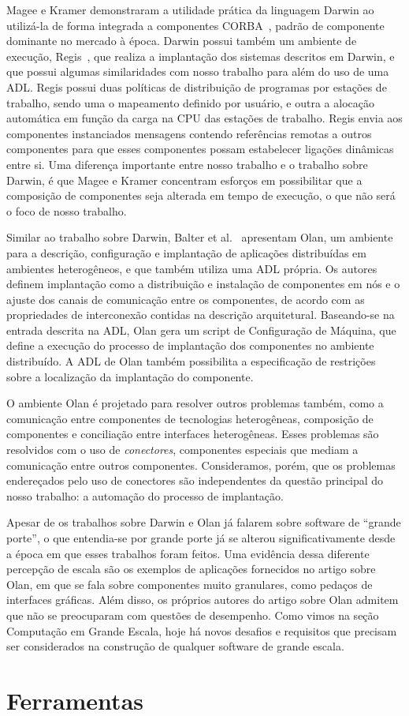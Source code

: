 Magee e Kramer demonstraram a utilidade prática da linguagem Darwin ao utilizá-la de forma integrada a componentes CORBA~\cite{Magee1997Corba}, padrão de componente dominante no mercado à época. Darwin possui também um ambiente de execução, Regis~\cite{Magee1994Regis}, que realiza a implantação dos sistemas descritos em Darwin, e que possui algumas similaridades com nosso trabalho para além do uso de uma ADL. Regis possui duas políticas de distribuição de programas por estações de trabalho, sendo uma o mapeamento definido por usuário, e outra a alocação automática em função da carga na CPU das estações de trabalho. Regis envia aos componentes instanciados mensagens contendo referências remotas a outros componentes para que esses componentes possam estabelecer ligações dinâmicas entre si. Uma diferença importante entre nosso trabalho e o trabalho sobre Darwin, é que Magee e Kramer concentram esforços em possibilitar que a composição de componentes seja alterada em tempo de execução, o que não será o foco de nosso trabalho.

Similar ao trabalho sobre Darwin, Balter et al.~\cite{Balter1998Olan} apresentam Olan, um ambiente para a descrição, configuração e implantação de aplicações distribuídas em ambientes heterogêneos, e que também utiliza uma ADL própria. Os autores definem implantação como a distribuição e instalação de componentes em nós e o ajuste dos canais de comunicação entre os componentes, de acordo com as propriedades de interconexão contidas na descrição arquitetural. Baseando-se na entrada descrita na ADL, Olan gera um script de Configuração de Máquina, que define a execução do processo de implantação dos componentes no ambiente distribuído. A ADL de Olan também possibilita a especificação de restrições sobre a localização da implantação do componente.

O ambiente Olan é projetado para resolver outros problemas também, como a comunicação entre componentes de tecnologias heterogêneas, composição de componentes e conciliação entre interfaces heterogêneas. Esses problemas são resolvidos com o uso de \emph{conectores}, componentes especiais que mediam a comunicação entre outros componentes. Consideramos, porém, que os problemas endereçados pelo uso de conectores são independentes da questão principal do nosso trabalho: a automação do processo de implantação.

Apesar de os trabalhos sobre Darwin e Olan já falarem sobre software de ``grande porte'', o que entendia-se por grande porte já se alterou significativamente desde a época em que esses trabalhos foram feitos. Uma evidência dessa diferente percepção de escala são os exemplos de aplicações fornecidos no artigo sobre Olan, em que se fala sobre componentes muito granulares, como pedaços de interfaces gráficas. Além disso, os próprios autores do artigo sobre Olan admitem que não se preocuparam com questões de desempenho. Como vimos na seção Computação em Grande Escala, hoje há novos desafios e requisitos que precisam ser considerados na construção de qualquer software de grande escala. 

\section{Ferramentas}